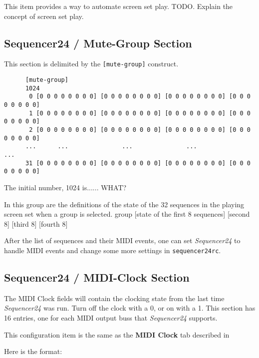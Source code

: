    This item provides a way to automate screen set play.
   TODO.
   Explain the concept of screen set play.

\subsection{Sequencer24 / Mute-Group Section}
\label{subsec:seq24_rc_file_mute_group}
     
   This section is delimited by the \texttt{[mute-group]} construct.

   \begin{verbatim}
      [mute-group]
      1024
       0 [0 0 0 0 0 0 0 0] [0 0 0 0 0 0 0 0] [0 0 0 0 0 0 0 0] [0 0 0 0 0 0 0 0]
       1 [0 0 0 0 0 0 0 0] [0 0 0 0 0 0 0 0] [0 0 0 0 0 0 0 0] [0 0 0 0 0 0 0 0]
       2 [0 0 0 0 0 0 0 0] [0 0 0 0 0 0 0 0] [0 0 0 0 0 0 0 0] [0 0 0 0 0 0 0 0]
      ...      ...               ...               ...               ...
      31 [0 0 0 0 0 0 0 0] [0 0 0 0 0 0 0 0] [0 0 0 0 0 0 0 0] [0 0 0 0 0 0 0 0]
   \end{verbatim}

   The initial number, 1024 is...... WHAT?

   In this group are the definitions of the state of the 32 sequences
   in the playing screen set when a group is selected.
   group [state of the first 8 sequences] [second 8] [third 8] [fourth 8]

   After the list of sequences and their MIDI events, one can 
   set \textsl{Sequencer24} to handle MIDI events and change some more settings
   in \texttt{sequencer24rc}.

\subsection{Sequencer24 / MIDI-Clock Section}
\label{subsec:seq24_rc_file_midi_clock}

   The MIDI Clock fields will contain the clocking state from the last 
   time \textsl{Sequencer24} was run.  Turn off the clock with a 0, or on with a 1.
   This section has 16 entries, one for each MIDI output buss that
   \textsl{Sequencer24} supports.

   This configuration item is the same as the 
   \textbf{MIDI Clock} tab described in
   
   Here is the format:

